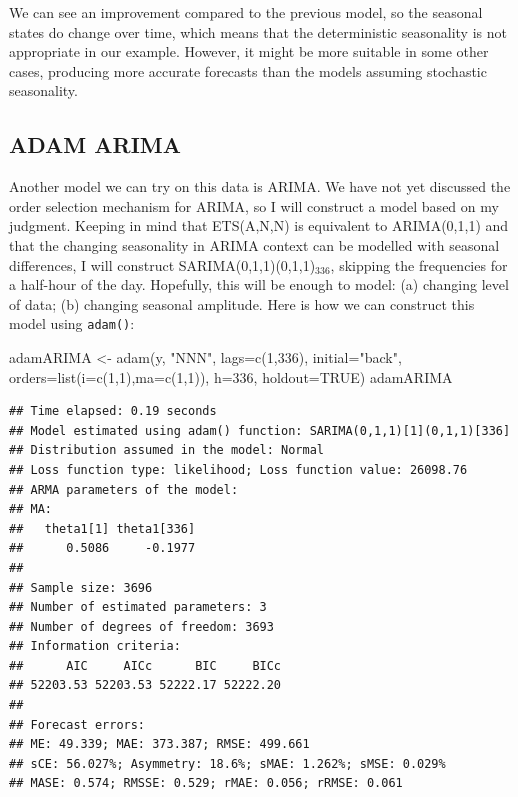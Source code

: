 \documentclass[
]{book}
\newenvironment{Shaded}{\begin{snugshade}}{\end{snugshade}}
\newcommand{\AttributeTok}[1]{\textcolor[rgb]{0.77,0.63,0.00}{#1}}
\newcommand{\ConstantTok}[1]{\textcolor[rgb]{0.00,0.00,0.00}{#1}}
\newcommand{\DecValTok}[1]{\textcolor[rgb]{0.00,0.00,0.81}{#1}}
\newcommand{\FunctionTok}[1]{\textcolor[rgb]{0.00,0.00,0.00}{#1}}
\newcommand{\NormalTok}[1]{#1}
\newcommand{\OtherTok}[1]{\textcolor[rgb]{0.56,0.35,0.01}{#1}}
\newcommand{\StringTok}[1]{\textcolor[rgb]{0.31,0.60,0.02}{#1}}
\theoremstyle{definition}
\theoremstyle{definition}
\theoremstyle{definition}
\theoremstyle{definition}
\theoremstyle{remark}
\begin{document}
We can see an improvement compared to the previous model, so the seasonal states do change over time, which means that the deterministic seasonality is not appropriate in our example. However, it might be more suitable in some other cases, producing more accurate forecasts than the models assuming stochastic seasonality.

\hypertarget{adam-arima}{%
\subsection{ADAM ARIMA}\label{adam-arima}}

Another model we can try on this data is ARIMA. We have not yet discussed the order selection mechanism for ARIMA, so I will construct a model based on my judgment. Keeping in mind that ETS(A,N,N) is equivalent to ARIMA(0,1,1) and that the changing seasonality in ARIMA context can be modelled with seasonal differences, I will construct SARIMA(0,1,1)(0,1,1)\(_{336}\), skipping the frequencies for a half-hour of the day. Hopefully, this will be enough to model: (a) changing level of data; (b) changing seasonal amplitude. Here is how we can construct this model using \texttt{adam()}:

\begin{Shaded}
\begin{Highlighting}[]
\NormalTok{adamARIMA }\OtherTok{\textless{}{-}} \FunctionTok{adam}\NormalTok{(y, }\StringTok{"NNN"}\NormalTok{, }\AttributeTok{lags=}\FunctionTok{c}\NormalTok{(}\DecValTok{1}\NormalTok{,}\DecValTok{336}\NormalTok{), }\AttributeTok{initial=}\StringTok{"back"}\NormalTok{,}
                  \AttributeTok{orders=}\FunctionTok{list}\NormalTok{(}\AttributeTok{i=}\FunctionTok{c}\NormalTok{(}\DecValTok{1}\NormalTok{,}\DecValTok{1}\NormalTok{),}\AttributeTok{ma=}\FunctionTok{c}\NormalTok{(}\DecValTok{1}\NormalTok{,}\DecValTok{1}\NormalTok{)),}
                  \AttributeTok{h=}\DecValTok{336}\NormalTok{, }\AttributeTok{holdout=}\ConstantTok{TRUE}\NormalTok{)}
\NormalTok{adamARIMA}
\end{Highlighting}
\end{Shaded}

\begin{verbatim}
## Time elapsed: 0.19 seconds
## Model estimated using adam() function: SARIMA(0,1,1)[1](0,1,1)[336]
## Distribution assumed in the model: Normal
## Loss function type: likelihood; Loss function value: 26098.76
## ARMA parameters of the model:
## MA:
##   theta1[1] theta1[336] 
##      0.5086     -0.1977 
## 
## Sample size: 3696
## Number of estimated parameters: 3
## Number of degrees of freedom: 3693
## Information criteria:
##      AIC     AICc      BIC     BICc 
## 52203.53 52203.53 52222.17 52222.20 
## 
## Forecast errors:
## ME: 49.339; MAE: 373.387; RMSE: 499.661
## sCE: 56.027%; Asymmetry: 18.6%; sMAE: 1.262%; sMSE: 0.029%
## MASE: 0.574; RMSSE: 0.529; rMAE: 0.056; rRMSE: 0.061
\end{verbatim}
\end{document}
